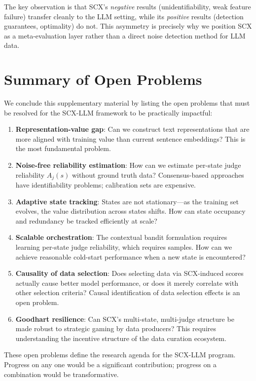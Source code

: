 \documentclass[11pt]{article}
\begin{document}
The key observation is that SCX's \textit{negative} results (unidentifiability, weak feature failure) transfer cleanly to the LLM setting, while its \textit{positive} results (detection guarantees, optimality) do not. This asymmetry is precisely why we position SCX as a meta-evaluation layer rather than a direct noise detection method for LLM data.

\section{Summary of Open Problems}

We conclude this supplementary material by listing the open problems that must be resolved for the SCX-LLM framework to be practically impactful:

\begin{enumerate}[label=O\arabic*.]
    \item \textbf{Representation-value gap}: Can we construct text representations that are more aligned with training value than current sentence embeddings? This is the most fundamental problem.
    \item \textbf{Noise-free reliability estimation}: How can we estimate per-state judge reliability $A_j(s)$ without ground truth data? Consensus-based approaches have identifiability problems; calibration sets are expensive.
    \item \textbf{Adaptive state tracking}: States are not stationary---as the training set evolves, the value distribution across states shifts. How can state occupancy and redundancy be tracked efficiently at scale?
    \item \textbf{Scalable orchestration}: The contextual bandit formulation requires learning per-state judge reliability, which requires samples. How can we achieve reasonable cold-start performance when a new state is encountered?
    \item \textbf{Causality of data selection}: Does selecting data via SCX-induced scores actually cause better model performance, or does it merely correlate with other selection criteria? Causal identification of data selection effects is an open problem.
    \item \textbf{Goodhart resilience}: Can SCX's multi-state, multi-judge structure be made robust to strategic gaming by data producers? This requires understanding the incentive structure of the data curation ecosystem.
\end{enumerate}

These open problems define the research agenda for the SCX-LLM program. Progress on any one would be a significant contribution; progress on a combination would be transformative.
\end{document}
